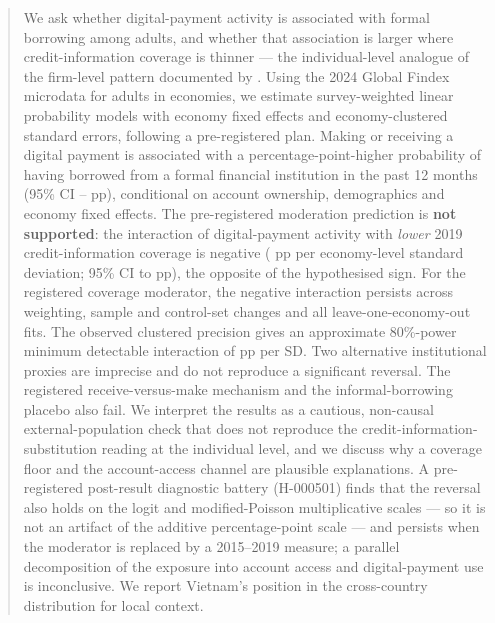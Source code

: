 
\begin{abstract}
\noindent We ask whether digital-payment activity is associated with formal borrowing
among adults, and whether that association is larger where credit-information coverage is
thinner --- the individual-level analogue of the firm-level pattern documented by
\citet{GalileaFaraziMare2026}. Using the 2024 Global Findex microdata for \NAdults{} adults
in \NEconomies{} economies, we estimate survey-weighted linear probability models with
economy fixed effects and economy-clustered standard errors, following a pre-registered
plan. Making or receiving a digital payment is associated with a \MOneBeta{}
percentage-point-higher probability of having borrowed from a formal financial institution
in the past 12 months (95\% CI \MOneCIlo{}--\MOneCIhi{} pp), conditional on account
ownership, demographics and economy fixed effects. The pre-registered moderation prediction
is \textbf{not supported}: the interaction of digital-payment activity with \emph{lower}
2019 credit-information coverage is negative (\MTwoBetaThree{} pp per economy-level standard
deviation; 95\% CI \MTwoBetaThreeCIlo{} to \MTwoBetaThreeCIhi{} pp), the opposite of the
hypothesised sign. For the registered coverage moderator, the negative interaction persists
across weighting, sample and control-set changes and all \NEconomies{} leave-one-economy-out
fits. The observed clustered precision gives an approximate 80\%-power minimum detectable
interaction of \MDEpp{} pp per SD. Two alternative institutional proxies are imprecise and
do not reproduce a significant reversal. The registered receive-versus-make mechanism and
the informal-borrowing placebo also fail. We interpret the results as a cautious, non-causal
external-population check that does not reproduce the credit-information-substitution reading
at the individual level, and we discuss why a coverage floor and the account-access channel
are plausible explanations. A pre-registered post-result diagnostic battery (H-000501) finds
that the reversal also holds on the logit and modified-Poisson multiplicative scales --- so it
is not an artifact of the additive percentage-point scale --- and persists when the moderator
is replaced by a 2015--2019 measure; a parallel decomposition of the exposure into account
access and digital-payment use is inconclusive. We report Vietnam's position in the
cross-country distribution for local context.


\end{abstract}
